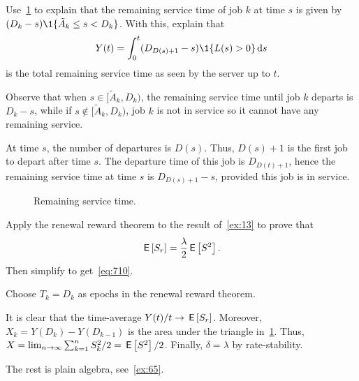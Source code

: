 \begin{exercise}
 Use~\cref{fig:mg1remainingservicetime} to explain that the remaining service time of job $k$ at time $s$ is given by
$(D_k-s)\1{\tilde A_k \leq s < D_k}$.
With this, explain that
 \begin{equation*}
 Y(t) = \int_0^t (D_{D(s)+1}-s)\1{L(s) > 0} \d s
 \end{equation*}
is the total remaining service time as seen by the server up to $t$. 
\begin{solution}
 Observe that when $s\in [\tilde A_k, D_k)$, the remaining service time until job $k$ departs is $D_k-s $, while if $s\not \in [\tilde A_k, D_k)$, job $k$ is not in service so it cannot have any remaining service.

 At time $s$, the number of departures is $D(s)$.
 Thus, $D(s)+1$ is the first job to depart after time $s$.
 The departure time of this job is $D_{D(t)+1}$, hence the remaining service time at time $s$ is $D_{D(s)+1}-s$, provided this job is in service.
\end{solution}
\end{exercise}


\begin{figure}[htb]
 \centering
{}

 \caption{Remaining service time.}
 \label{fig:mg1remainingservicetime}
\end{figure}

\begin{exercise}
Apply the renewal reward theorem to the result of~\cref{ex:13} to prove that 
\begin{equation}\label{eq:34}
\,\mathsf{E}\left[S_r\right] = \frac{\lambda}2 \,\mathsf{E}\left[S^2\right]. 
\end{equation}
Then simplify to get~\cref{eq:710}. 
\begin{hint}
 Choose $T_k=D_k$ as epochs in the renewal reward theorem.
\end{hint}
\begin{solution}
 It is clear that the time-average $Y(t)/t \to \,\mathsf{E}\left[S_r\right]$.
 Moreover, $X_k = Y(D_k) - Y(D_{k-1})$ is the area under the triangle in~\cref{fig:mg1remainingservicetime}.
 Thus, $X=\lim_{n\to\infty} \sum_{k=1}^n S_k^2/ 2 = \,\mathsf{E}\left[S^2\right]/2$.
 Finally, $\delta = \lambda$ by rate-stability.

 The rest is plain algebra, see~\cref{ex:65}.
\end{solution}
\end{exercise}

